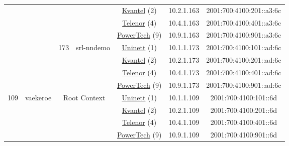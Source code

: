 \begin{small}
\begin{center}
\begin{longtable}{|c|c|c|c|c|c|c|c|}
  &  &  &  & \multicolumn{2}{|c|}{\tiny{\href{http://kvantel.no}{Kvantel} (2)}} & \tiny{10.2.1.163} & \tiny{2001:700:4100:201::a3:6c} \\* \cline{5-5}\cline{6-6}\cline{7-7}\cline{8-8}
  &  &  &  & \multicolumn{2}{|c|}{\tiny{\href{https://www.telenor.no}{Telenor} (4)}} & \tiny{10.4.1.163} & \tiny{2001:700:4100:401::a3:6c} \\* \cline{5-5}\cline{6-6}\cline{7-7}\cline{8-8}
  &  &  &  & \multicolumn{2}{|c|}{\tiny{\href{http://www.powertech.no}{PowerTech} (9)}} & \tiny{10.9.1.163} & \tiny{2001:700:4100:901::a3:6c} \\* \cline{3-3}\cline{4-4}\cline{5-5}\cline{6-6}\cline{7-7}\cline{8-8}
  &  & \multirow{4}{*}{\tiny{173}} & \multicolumn{1}{|l|}{\multirow{4}{*}{\tiny{srl-nndemo}}} & \multicolumn{2}{|c|}{\tiny{\href{https://www.uninett.no}{Uninett} (1)}} & \tiny{10.1.1.173} & \tiny{2001:700:4100:101::ad:6c} \\* \cline{5-5}\cline{6-6}\cline{7-7}\cline{8-8}
  &  &  &  & \multicolumn{2}{|c|}{\tiny{\href{http://kvantel.no}{Kvantel} (2)}} & \tiny{10.2.1.173} & \tiny{2001:700:4100:201::ad:6c} \\* \cline{5-5}\cline{6-6}\cline{7-7}\cline{8-8}
  &  &  &  & \multicolumn{2}{|c|}{\tiny{\href{https://www.telenor.no}{Telenor} (4)}} & \tiny{10.4.1.173} & \tiny{2001:700:4100:401::ad:6c} \\* \cline{5-5}\cline{6-6}\cline{7-7}\cline{8-8}
  &  &  &  & \multicolumn{2}{|c|}{\tiny{\href{http://www.powertech.no}{PowerTech} (9)}} & \tiny{10.9.1.173} & \tiny{2001:700:4100:901::ad:6c} \\ \hline
 \multirow{24}{*}{\tiny{109}} & \multicolumn{1}{|l|}{\multirow{24}{*}{\tiny{vaekeroe}}} & \multicolumn{2}{|c|}{\multirow{4}{*}{\tiny{Root Context}}} & \multicolumn{2}{|c|}{\tiny{\href{https://www.uninett.no}{Uninett} (1)}} & \tiny{10.1.1.109} & \tiny{2001:700:4100:101::6d} \\* \cline{5-5}\cline{6-6}\cline{7-7}\cline{8-8}
  &  & \multicolumn{2}{|c|}{} & \multicolumn{2}{|c|}{\tiny{\href{http://kvantel.no}{Kvantel} (2)}} & \tiny{10.2.1.109} & \tiny{2001:700:4100:201::6d} \\* \cline{5-5}\cline{6-6}\cline{7-7}\cline{8-8}
  &  & \multicolumn{2}{|c|}{} & \multicolumn{2}{|c|}{\tiny{\href{https://www.telenor.no}{Telenor} (4)}} & \tiny{10.4.1.109} & \tiny{2001:700:4100:401::6d} \\* \cline{5-5}\cline{6-6}\cline{7-7}\cline{8-8}
  &  & \multicolumn{2}{|c|}{} & \multicolumn{2}{|c|}{\tiny{\href{http://www.powertech.no}{PowerTech} (9)}} & \tiny{10.9.1.109} & \tiny{2001:700:4100:901::6d} \\* \cline{3-3}\cline{4-4}\cline{5-5}\cline{6-6}\cline{7-7}\cline{8-8}

\end{longtable}
\end{center}
\end{small}
